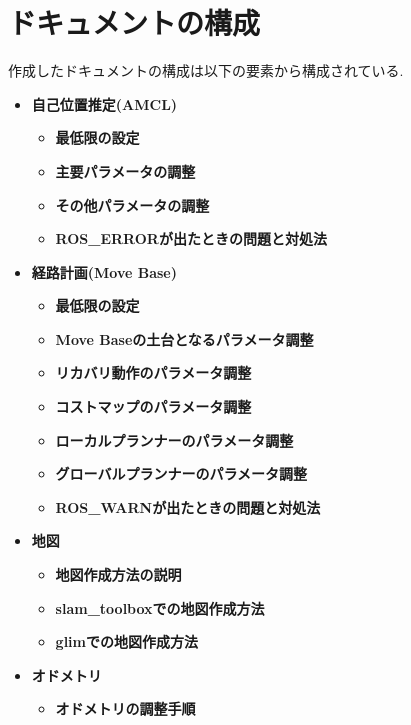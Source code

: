 \section{ドキュメントの構成}
作成したドキュメントの構成は以下の要素から構成されている. 
\begin{itemize}
     \item \textbf{自己位置推定(AMCL)}
     \begin{itemize}
        \item \textbf{最低限の設定}
        \item \textbf{主要パラメータの調整}
        \item \textbf{その他パラメータの調整}
        \item \textbf{ROS\_ERRORが出たときの問題と対処法}
    \end{itemize}
     \item \textbf{経路計画(Move Base)}
    \begin{itemize}
        \item \textbf{最低限の設定}
        \item \textbf{Move Baseの土台となるパラメータ調整}
        \item \textbf{リカバリ動作のパラメータ調整}
        \item \textbf{コストマップのパラメータ調整}
        \item \textbf{ローカルプランナーのパラメータ調整}
        \item \textbf{グローバルプランナーのパラメータ調整}
        \item \textbf{ROS\_WARNが出たときの問題と対処法}
    \end{itemize}
\newpage
     \item \textbf{地図}
    \begin{itemize}
        \item \textbf{地図作成方法の説明}
        \item \textbf{slam\_toolboxでの地図作成方法}
        \item \textbf{glimでの地図作成方法}
    \end{itemize}
    \item \textbf{オドメトリ}
    \begin{itemize}
        \item \textbf{オドメトリの調整手順}
    \end{itemize}     
\end{itemize}